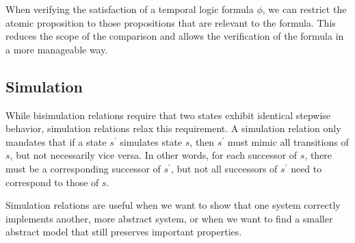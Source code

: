 When verifying the satisfaction of a temporal logic formula $\phi$, we can restrict the atomic proposition to those propositions that are relevant to the formula. 
This reduces the scope of the comparison and allows the verification of the formula in a more manageable way.

\subsection{Simulation}
While bisimulation relations require that two states exhibit identical stepwise behavior, simulation relations relax this requirement. 
A simulation relation only mandates that if a state $s^\prime$ simulates state $s$, then $s^\prime$ must mimic all transitions of $s$, but not necessarily vice versa. 
In other words, for each successor of $s$, there must be a corresponding successor of $s^\prime$, but not all successors of $s^\prime$ need to correspond to those of $s$.

Simulation relations are useful when we want to show that one system correctly implements another, more abstract system, or when we want to find a smaller abstract model that still preserves important properties.

